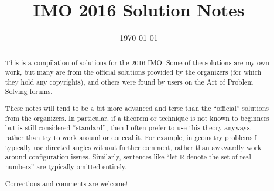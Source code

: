 \documentclass[11pt]{scrartcl}
\title{IMO 2016 Solution Notes}
\date{\today}
\begin{document}
\maketitle

\begin{abstract}
This is a compilation of solutions
for the 2016 IMO.
Some of the solutions are my own work,
but many are from the official solutions provided by the organizers
(for which they hold any copyrights),
and others were found by users on the Art of Problem Solving forums.

These notes will tend to be a bit more advanced and terse than the ``official''
solutions from the organizers.
In particular, if a theorem or technique is not known to beginners
but is still considered ``standard'', then I often prefer to
use this theory anyways, rather than try to work around or conceal it.
For example, in geometry problems I typically use directed angles
without further comment, rather than awkwardly work around configuration issues.
Similarly, sentences like ``let $\mathbb{R}$ denote the set of real numbers''
are typically omitted entirely.

Corrections and comments are welcome!
\end{abstract}

\tableofcontents
\newpage

\addtocounter{section}{-1}
\end{document}
